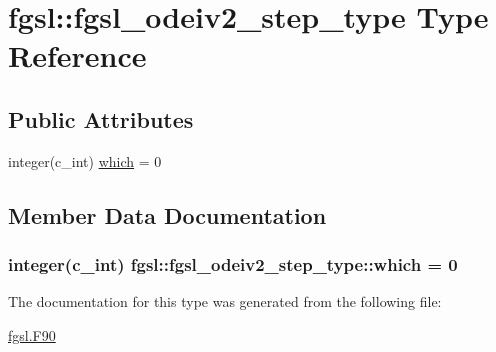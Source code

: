 \hypertarget{structfgsl_1_1fgsl__odeiv2__step__type}{\section{fgsl\-:\-:fgsl\-\_\-odeiv2\-\_\-step\-\_\-type Type Reference}
\label{structfgsl_1_1fgsl__odeiv2__step__type}
}
\subsection*{Public Attributes}
\begin{DoxyCompactItemize}
\item 
integer(c\-\_\-int) \hyperlink{structfgsl_1_1fgsl__odeiv2__step__type_ab4a77212d5bcaad18c0983e035d3e29f}{which} = 0
\end{DoxyCompactItemize}


\subsection{Member Data Documentation}
\hypertarget{structfgsl_1_1fgsl__odeiv2__step__type_ab4a77212d5bcaad18c0983e035d3e29f}{
\subsubsection[{which}]{\setlength{\rightskip}{0pt plus 5cm}integer(c\-\_\-int) fgsl\-::fgsl\-\_\-odeiv2\-\_\-step\-\_\-type\-::which = 0}}\label{structfgsl_1_1fgsl__odeiv2__step__type_ab4a77212d5bcaad18c0983e035d3e29f}


The documentation for this type was generated from the following file\-:\begin{DoxyCompactItemize}
\item 
\hyperlink{fgsl_8F90}{fgsl.\-F90}\end{DoxyCompactItemize}
